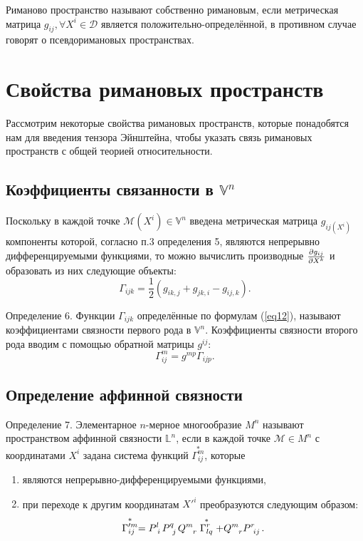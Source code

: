 \documentclass[14pt,a4paper]{extarticle}
\begin{document}
Риманово пространство называют собственно римановым, если метрическая матрица $g_{ij}, \forall X^i \in \mathcal{D}$ является положительно-определённой, в противном случае говорят о псевдоримановых пространствах.


\section{Свойства римановых пространств}
Рассмотрим некоторые свойства римановых пространств, которые понадобятся нам для введения тензора Эйнштейна, чтобы указать связь римановых пространств с общей теорией относительности.

\subsection{Коэффициенты связанности в $\mathbb{V}^n$}
Поскольку в каждой точке $\mathcal{M}(X^i) \in \mathbb{V}^n$ введена метрическая матрица $g_{ij(X^i)}$ компоненты которой, согласно п.3 определения 5, являются непрерывно дифференцируемыми функциями, то можно вычислить производные $\pdv{g_{ij}}{X^k}$ и образовать из них следующие объекты:
\begin{equation}\label{eq12}
	\Gamma_{ijk} = \frac{1}{2}(g_{ik,j} + g_{jk,i} - g_{ij,k}).
\end{equation}

Определение 6. Функции $\Gamma_{ijk}$ определённые по формулам (\ref{eq12}), называют коэффициентами связности первого рода в $\mathbb{V}^n$. Коэффициенты связности второго рода вводим с помощью обратной матрицы $g^{ij}$:
\begin{equation}\label{eq13}
	\Gamma_{ij}^m = g^{mp}\Gamma_{ijp}.
\end{equation}


\subsection{Определение аффинной связности}
Определение 7. Элементарное $n$-мерное многообразие $M^n$ называют пространством аффинной связности $\mathbb{L}^n$, если в каждой точке $\mathcal{M} \in M^n$ с координатами $X^i$ задана система функций $\overset{*}{\Gamma_{ij}^m}$, которые
\begin{enumerate}
	\item являются непрерывно-дифференцируемыми функциями,
	\item при переходе к другим координатам $X'^i$ преобразуются следующим образом:
	\begin{equation}\label{eq14}
		\stackrel{*}{\Gamma_{ij}^{\prime m}}=P\indices{^{l}_{i}} P\indices{^{q}_{j}} Q\indices{^{m}_{r}} \stackrel{*}{\Gamma_{lq}^{r}}+Q\indices{^{m}_{r}} P\indices{^{r}_{i j}}.
	\end{equation}
\end{enumerate}
\end{document}

